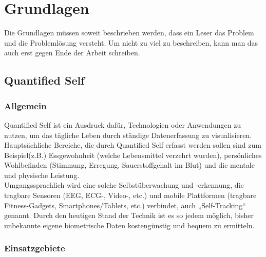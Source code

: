 
\chapter{Grundlagen}
\label{ch:Grundlagen}
Die Grundlagen müssen soweit beschrieben werden, dass ein Leser das Problem und die Problemlösung versteht.
Um nicht zu viel zu beschreiben, kann man das auch erst gegen Ende der Arbeit schreiben. 


\section{Quantified Self}
\label{ch:Grundlagen:sec:QuantifiedSelf}

\subsection{Allgemein}
\label{ch:Grundlagen:sec:QuantifiedSelf:subsec:Allgemein}

Quantified Self ist ein Ausdruck dafür, Technologien oder Anwendungen zu nutzen, um das tägliche Leben durch ständige Datenerfassung zu visualisieren. 
Hauptsächliche Bereiche, die durch Quantified Self erfasst werden sollen sind zum Beispiel(z.B.) Essgewohnheit (welche Lebensmittel verzehrt wurden), persönliches Wohlbefinden (Stimmung, Erregung, Sauerstoffgehalt im Blut) und die mentale und physische Leistung\cite{web:WhatIsQS}. \\
Umgangssprachlich wird eine solche Selbstüberwachung und -erkennung, die tragbare Sensoren (EEG, ECG-, Video-, etc.) und mobile Plattformen (tragbare Fitness-Gadgets, Smartphones/Tablets, etc.) verbindet, auch „Self-Tracking“ genannt. 
Durch den heutigen Stand der Technik ist es so jedem möglich, bisher unbekannte eigene biometrische Daten kostengünstig und bequem zu ermitteln.

\subsection{Einsatzgebiete}
\label{ch:Grundlagen:sec:QuantifiedSelf:subsec:Einsatzgebiete}

